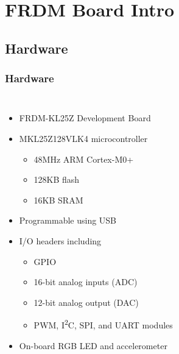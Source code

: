 \documentclass{beamer}
\begin{document}
\section{FRDM Board Intro} %
\subsection{Hardware}
\begin{frame}
\frametitle{Hardware}
\begin{columns}[t]
\begin{itemize}
  \item FRDM-KL25Z Development Board
  \item MKL25Z128VLK4 microcontroller
  \begin{itemize}
    \item 48MHz ARM Cortex-M0+
    \item 128KB flash
    \item 16KB SRAM
  \end{itemize}
  \item Programmable using USB
  \item I/O headers including
  \begin{itemize}
    \item GPIO
    \item 16-bit analog inputs (ADC)
    \item 12-bit analog output (DAC)
    \item PWM, I\textsuperscript{2}C, SPI, and UART modules
  \end{itemize}
  \item On-board RGB LED and accelerometer
\end{itemize}


\end{columns}
\end{frame}
\end{document}
